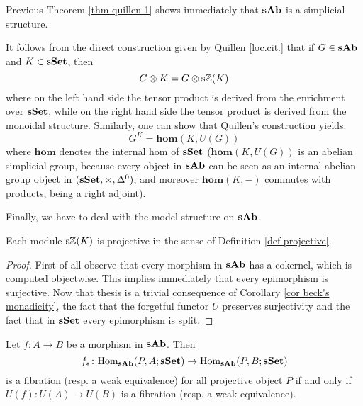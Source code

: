 \begin{refsection}
Previous Theorem \ref{thm quillen 1} shows immediately that $\mathbf s \mathbf{Ab}$ is a simplicial structure.

\begin{rmk}
It follows from the direct construction given by Quillen [loc.cit.] that if $G \in \mathbf s \mathbf{Ab}$ and $K \in \mathbf{sSet}$, then
\[
G \otimes K = G \otimes \mathrm s \mathbb{Z}(K)
\]
where on the left hand side the tensor product is derived from the enrichment over $\mathbf{sSet}$, while on the right hand side the tensor product is derived from the monoidal structure. Similarly, one can show that Quillen's construction yields:
\[
G^K = \mathbf{hom}(K,U(G))
\]
where $\mathbf{hom}$ denotes the internal hom of $\mathbf{sSet}$ ($\mathbf{hom}(K,U(G))$ is an abelian simplicial group, because every object in $\mathbf s \mathbf{Ab}$ can be seen as an internal abelian group object in $(\mathbf{sSet}, \times, \Delta^0)$, and moreover $\mathbf{hom}(K,-)$ commutes with products, being a right adjoint).
\end{rmk}


Finally, we have to deal with the model structure on $\mathbf s \mathbf{Ab}$.

\begin{lemma} \label{lemma projective in sAb}
Each module $\mathrm s \mathbb{Z}(K)$ is projective in the sense of Definition \ref{def projective}.
\end{lemma}

\begin{proof}
First of all observe that every morphism in $\mathbf s \mathbf{Ab}$ has a cokernel, which is computed objectwise. This implies immediately that every epimorphism is surjective. Now that thesis is a trivial consequence of Corollary \ref{cor beck's monadicity}, the fact that the forgetful functor $U$ preserves surjectivity and the fact that in $\mathbf{sSet}$ every epimorphism is split.
\end{proof}

\begin{lemma}
Let $f \colon A \to B$ be a morphism in $\mathbf s \mathbf{Ab}$. Then
\[
f_* \colon \mathrm{Hom}_{\mathbf s \mathbf{Ab}}(P,A;\mathbf{sSet}) \to \mathrm{Hom}_{\mathbf s \mathbf{Ab}}(P,B;\mathbf{sSet})
\]
is a fibration (resp. a weak equivalence) for all projective object $P$ if and only if $U(f) \colon U(A) \to U(B)$ is a fibration (resp. a weak equivalence).
\end{lemma}


\end{refsection}
